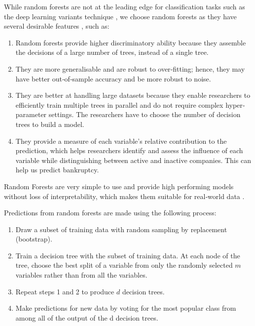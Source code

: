 
While random forests are not at the leading edge for classification tasks such as the deep learning variants technique \cite{krizhevsky2012imagenet, tanaka2017forecasting}, we choose random forests as they have several desirable features \cite{kuhn2013applied}, such as:

\begin{enumerate}
    \item Random forests provide higher discriminatory ability because they assemble the decisions of a large number of trees, instead of a single tree. 
    \item They are more generalisable and are robust to over‐fitting; hence, they may have better out‐of‐sample accuracy and be more robust to noise. 
    \item They are better at handling large datasets because they enable researchers to efficiently train multiple trees in parallel and do not require complex hyper‐parameter settings. The researchers have to choose the number of decision trees to build a model.
    
    \item They provide a measure of each variable's relative contribution to the prediction, which helps researchers identify and assess the influence of each variable while distinguishing between active and inactive companies. This can help us predict bankruptcy.
\end{enumerate}

Random Forests are very simple to use and provide high performing models without loss of interpretability, which makes them suitable for real‐world data \cite{kuhn2013applied}. 



Predictions from random forests are made using the following process:

\begin{enumerate}
  \item Draw a subset of training data with random sampling by replacement (bootstrap).
  
  \item Train a decision tree with the subset of training data. At each node of the tree, choose the best split of a variable from only the randomly selected $m$ variables rather than from all the variables.
  
  \item Repeat steps 1 and 2 to produce $d$ decision trees.
  \item Make predictions for new data by voting for the most popular class from among all of the output of the d decision trees.
\end{enumerate}

